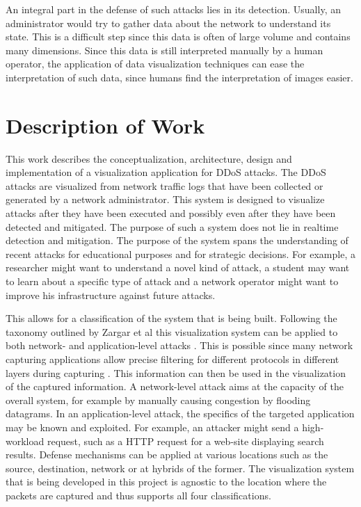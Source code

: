An integral part in the defense of such attacks lies in its detection. Usually, an administrator would try to gather data about the network to understand its state. This is a difficult step since this data is often of large volume and contains many dimensions.
Since this data is still interpreted manually by a human operator, the application of data visualization techniques can ease the interpretation of such data, since humans find the interpretation of images easier\cite{wu}.


\section{Description of Work}
This work describes the conceptualization, architecture, design and implementation of a visualization application for DDoS attacks.
The DDoS attacks are visualized from network traffic logs that have been collected or generated by a network administrator. This system is designed to visualize attacks after they have been executed and possibly even after they have been detected and mitigated. The purpose of such a system does not lie in realtime detection and mitigation. The purpose of the system spans the understanding of recent attacks for educational purposes and for strategic decisions. For example, a researcher might want to understand a novel kind of attack, a student may want to learn about a specific type of attack and a network operator might want to improve his infrastructure against future attacks.

This allows for a classification of the system that is being built. Following the taxonomy outlined by Zargar et al this visualization system can be applied to both network- and application-level attacks \cite{zargar}. This is possible since many network capturing applications allow precise filtering for different protocols in different layers during capturing \cite{tcpdump}. This information can then be used in the visualization of the captured information.
A network-level attack aims at the capacity of the overall system, for example by manually causing congestion by flooding datagrams. In an application-level attack, the specifics of the targeted application may be known and exploited. For example, an attacker might send a high-workload request, such as a HTTP request for a web-site displaying search results.
Defense mechanisms can be applied at various locations such as the source, destination, network or at hybrids of the former.
The visualization system that is being developed in this project is agnostic to the location where the packets are captured and thus supports all four classifications.


